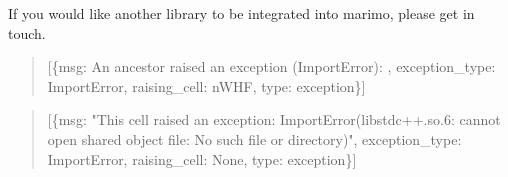 \documentclass[
  letterpaper,
  DIV=11,
  numbers=noendperiod]{scrartcl}
\begin{document}
If you would like another library to be integrated into marimo, please
get in touch.

\begin{quote}
{[}\{\textquotesingle msg\textquotesingle: \textquotesingle An ancestor
raised an exception (ImportError): \textquotesingle,
\textquotesingle exception\_type\textquotesingle:
\textquotesingle ImportError\textquotesingle,
\textquotesingle raising\_cell\textquotesingle:
\textquotesingle nWHF\textquotesingle,
\textquotesingle type\textquotesingle:
\textquotesingle exception\textquotesingle\}{]}
\end{quote}

\begin{quote}
{[}\{\textquotesingle msg\textquotesingle: "This cell raised an
exception: ImportError(\textquotesingle libstdc++.so.6: cannot open
shared object file: No such file or directory\textquotesingle)",
\textquotesingle exception\_type\textquotesingle:
\textquotesingle ImportError\textquotesingle,
\textquotesingle raising\_cell\textquotesingle: None,
\textquotesingle type\textquotesingle:
\textquotesingle exception\textquotesingle\}{]}
\end{quote}
\end{document}
